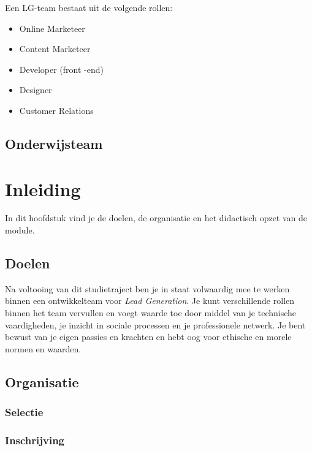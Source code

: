\documentclass[]{book}
\providecommand{\tightlist}{%
  \setlength{\itemsep}{0pt}\setlength{\parskip}{0pt}}
\begin{document}
Een LG-team bestaat uit de volgende rollen:

\begin{itemize}
\tightlist
\item
  Online Marketeer
\item
  Content Marketeer
\item
  Developer (front -end)
\item
  Designer
\item
  Customer Relations
\end{itemize}

\section{Onderwijsteam}\label{onderwijsteam}

\chapter{Inleiding}\label{inleiding}

In dit hoofdstuk vind je de doelen, de organisatie en het didactisch
opzet van de module.

\section{Doelen}\label{doelen}

Na voltooing van dit studietraject ben je in staat volwaardig mee te
werken binnen een ontwikkelteam voor \emph{Lead Generation}. Je kunt
verschillende rollen binnen het team vervullen en voegt waarde toe door
middel van je technische vaardigheden, je inzicht in sociale processen
en je professionele netwerk. Je bent bewust van je eigen passies en
krachten en hebt oog voor ethische en morele normen en waarden.

\section{Organisatie}\label{organisatie}

\subsection{Selectie}\label{selectie}

\subsection{Inschrijving}\label{inschrijving}
\end{document}
